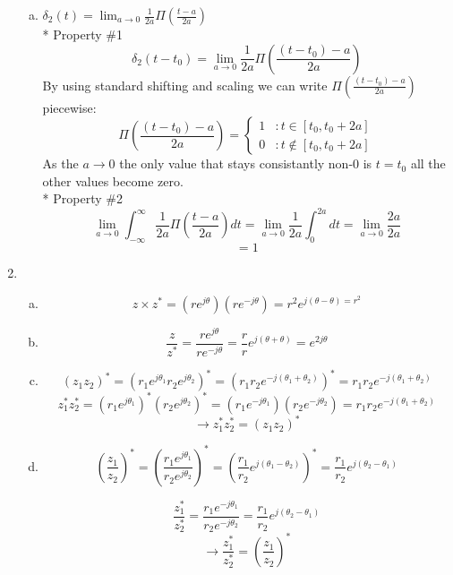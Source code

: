 \documentclass[10pt, letterpaper]{article}
\begin{document}
\begin{enumerate}[1)]
\begin{enumerate}[a.]
    \item
        $\delta_2(t) = \lim_{a \to 0} \frac{1}{2a} \Pi(\frac{t - a}{2a})$\\*
        Property \#1
        \[
        \delta_2(t - t_0) = \lim_{a \to 0} \frac{1}{2a} \Pi(\frac{(t -t_0) - a}{2a})
        \]
        By using standard shifting and scaling we can write $\Pi(\frac{(t -t_0) - a}{2a})$ piecewise:
        \[\Pi(\frac{(t -t_0) - a}{2a}) = \left\{
          \begin{array}{lr}
            1 & : t \in [t_0, t_0 + 2a]\\
            0 & : t \not\in [t_0, t_0 + 2a]
          \end{array}
        \right.
        \]
        As the $a \to 0$ the only value that stays consistantly non-0 is $t = t_0$
        all the other values become zero.
        \\*
        Property \#2
        \[
        \lim_{a \to 0} \int_{-\infty}^{\infty}\frac{1}{2a} \Pi(\frac{t - a}{2a})dt = 
        \lim_{a \to 0} \frac{1}{2a} \int_{0}^{2a}dt 
        = \lim_{a \to 0} \frac{2a}{2a} 
        \]
        \[= 1\]
    \end{enumerate}

\item
    \begin{enumerate}[a.]
    \item
        \[z \times z^* = (re^{j\theta})(re^{-j\theta}) = r^2 e^{j(\theta - \theta) = r^2} \]

    \item
        \[ \frac{z}{z^*} = \frac{re^{j\theta}}{re^{-j\theta}} = \frac{r}{r} e^{j (\theta + \theta)} = e^{2j\theta} \]
    
    \item
        \[(z_1 z_2)^* = (r_1 e^{j \theta_1} r_2 e^{j \theta_2})^* = (r_1 r_2 e^{-j(\theta_1 + \theta_2)})^* = r_1 r_2 e^{-j(\theta_1 + \theta_2)}\]
        \[z_1^* z_2^* = (r_1e^{j\theta_1})^* (r_2e^{j\theta_2})^* = (r_1e^{-j\theta_1}) (r_2e^{-j\theta_2})  = r_1 r_2 e^{-j(\theta_1 + \theta_2)} \]
        \[\rightarrow z_1^* z_2^* = (z_1 z_2)^*\]
    
    \item
        \[
        (\frac{z_1}{z_2})^*  = (\frac{r_1e^{j\theta_1}}{r_2e^{j\theta_2}})^* =   (\frac{r_1}{r_2} e^{j(\theta_1 - \theta_2)})^* =     
        \frac{r_1}{r_2} e^{j(\theta_2 - \theta_1)}
        \]

        \[
        \frac{z_1^*}{z_2^*} =
        \frac{r_1 e^{-j\theta_1}}{r_2 e^{-j\theta_2}} = 
        \frac{r_1}{r_2} e^{j(\theta_2 - \theta_1)}
        \]
        \[
        \rightarrow
        \frac{z_1^*}{z_2^*} =(\frac{z_1}{z_2})^* 
        \]
    \end{enumerate}


\end{enumerate}
\end{document}
